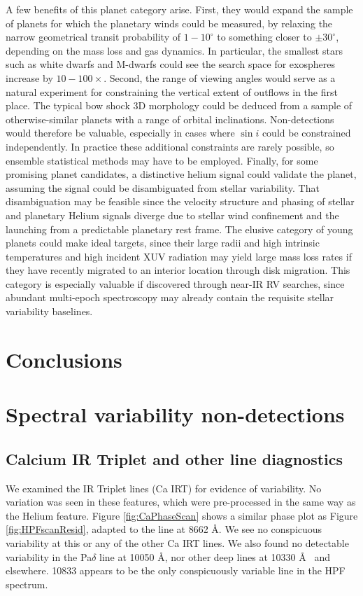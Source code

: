 \documentclass[twocolumn]{aastex631}
\begin{document}
A few benefits of this planet category arise.  First, they would expand the sample of planets for which the planetary winds could be measured, by relaxing the narrow geometrical transit probability of $1-10^\circ$ to something closer to $\pm30^\circ$, depending on the mass loss and gas dynamics.  In particular, the smallest stars such as white dwarfs and M-dwarfs could see the search space for exospheres increase by $10-100\times$.  Second, the range of viewing angles would serve as a natural experiment for constraining the vertical extent of outflows in the first place.  The typical bow shock 3D morphology could be deduced from a sample of otherwise-similar planets with a range of orbital inclinations.  Non-detections would therefore be valuable, especially in cases where $\sin{i}$ could be constrained independently.  In practice these additional constraints are rarely possible, so ensemble statistical methods may have to be employed.  Finally, for some promising planet candidates, a distinctive helium signal could validate the planet, assuming the signal could be disambiguated from stellar variability.  That disambiguation may be feasible since the velocity structure and phasing of stellar and planetary Helium signals diverge due to stellar wind confinement and the launching from a predictable planetary rest frame.  The elusive category of young planets could make ideal targets, since their large radii and high intrinsic temperatures and high incident XUV radiation may yield large mass loss rates if they have recently migrated to an interior location through disk migration.  This category is especially valuable if discovered through near-IR RV searches, since abundant multi-epoch spectroscopy may already contain the requisite stellar variability baselines.


\section{Conclusions}


\clearpage
\pagebreak


\appendix

\section{Spectral variability non-detections} \label{appendixSec}
\subsection{Calcium IR Triplet and other line diagnostics}
We examined the  IR Triplet lines (Ca IRT) for evidence of variability.  No variation was seen in these features, which were pre-processed in the same way as the Helium feature.  Figure \ref{fig:CaPhaseScan} shows a similar phase plot as Figure \ref{fig:HPFscanResid}, adapted to the line at 8662 \AA.  We see no conspicuous variability at this or any of the other Ca IRT lines.  We also found no detectable variability in the Pa$\delta$ line at 10050 \AA, nor other deep lines at 10330 \AA~ and elsewhere.   10833 appears to be the only conspicuously variable line in the HPF spectrum.
\end{document}

